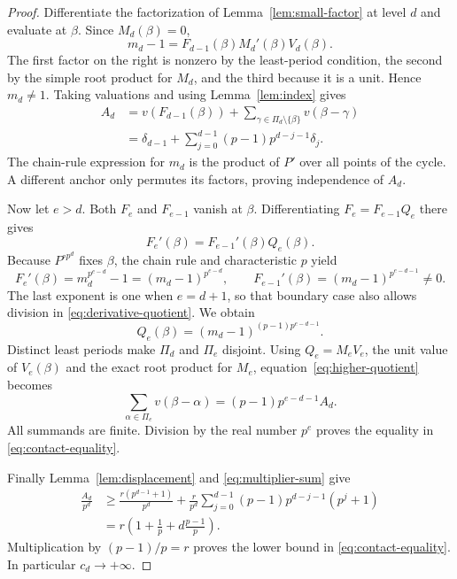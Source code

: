 \begin{proof}
Differentiate the factorization of Lemma~\ref{lem:small-factor}
at level $d$ and evaluate at $\beta$. Since $M_d(\beta)=0$,
\begin{equation}\label{eq:multiplier-product}
 m_d-1=F_{d-1}(\beta)M_d'(\beta)V_d(\beta).
\end{equation}
The first factor on the right is nonzero by the least-period
condition, the second by the simple root product for $M_d$, and
the third because it is a unit. Hence $m_d\ne1$. Taking valuations
and using Lemma~\ref{lem:index} gives
\begin{align*}
 A_d
 &=v(F_{d-1}(\beta))+
      \sum_{\gamma\in\Pi_d\setminus\{\beta\}}v(\beta-\gamma)\\
 &=\delta_{d-1}+\sum_{j=0}^{d-1}(p-1)p^{d-j-1}\delta_j.
\end{align*}
The chain-rule expression for $m_d$ is the product of $P'$ over
all points of the cycle. A different anchor only permutes its
factors, proving independence of $A_d$.

Now let $e>d$. Both $F_e$ and $F_{e-1}$ vanish at $\beta$.
Differentiating $F_e=F_{e-1}Q_e$ there gives
\begin{equation}\label{eq:derivative-quotient}
 F_e'(\beta)=F_{e-1}'(\beta)Q_e(\beta).
\end{equation}
Because $P^{\circ p^d}$ fixes $\beta$, the chain rule and
characteristic $p$ yield
\[
 F_e'(\beta)=m_d^{p^{e-d}}-1=(m_d-1)^{p^{e-d}},\qquad
 F_{e-1}'(\beta)=(m_d-1)^{p^{e-d-1}}\ne0.
\]
The last exponent is one when $e=d+1$, so that boundary case also
allows division in \eqref{eq:derivative-quotient}. We obtain
\begin{equation}\label{eq:higher-quotient}
 Q_e(\beta)=(m_d-1)^{(p-1)p^{e-d-1}}.
\end{equation}
Distinct least periods make $\Pi_d$ and $\Pi_e$ disjoint. Using
$Q_e=M_eV_e$, the unit value of $V_e(\beta)$ and the exact root
product for $M_e$, equation~\eqref{eq:higher-quotient} becomes
\begin{equation}\label{eq:contact-total}
 \sum_{\alpha\in\Pi_e}v(\beta-\alpha)
 =(p-1)p^{e-d-1}A_d.
\end{equation}
All summands are finite. Division by the real number $p^e$ proves
the equality in \eqref{eq:contact-equality}.

Finally Lemma~\ref{lem:displacement} and
\eqref{eq:multiplier-sum} give
\begin{align*}
 \frac{A_d}{p^d}
 &\ge \frac{r(p^{d-1}+1)}{p^d}
     +\frac r{p^d}\sum_{j=0}^{d-1}
        (p-1)p^{d-j-1}(p^j+1)\\
 &=r\left(1+\frac1p+d\frac{p-1}{p}\right).
\end{align*}
Multiplication by $(p-1)/p=r$ proves the lower bound in
\eqref{eq:contact-equality}. In particular $c_d\to+\infty$.
\end{proof}

